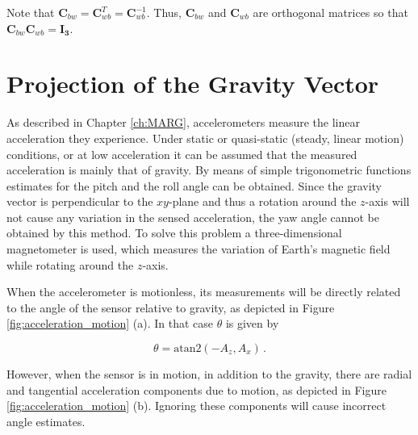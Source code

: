 \noindent
Note that $\mathbf{C}_{bw} = \mathbf{C}^T_{wb} = \mathbf{C}^{-1}_{wb}$. Thus, $\mathbf{C}^{ }_{bw}$ and $\mathbf{C}_{wb}$ are orthogonal matrices so that $\mathbf{C}^{ }_{bw} \mathbf{C}_{wb} = \mathbf{I_3}$.  

\section{Projection of the Gravity Vector}\label{sec:projection_gravity}


As described in Chapter \ref{ch:MARG}, accelerometers measure the linear acceleration they experience. Under static or quasi-static (steady, linear motion) conditions, or at low acceleration it can be assumed that the measured acceleration is mainly that of gravity. By means of simple trigonometric functions estimates for the pitch and the roll angle can be obtained. Since the gravity vector is perpendicular to the $xy$-plane and thus a rotation around the $z$-axis will not cause any variation in the sensed acceleration, the yaw angle cannot be obtained by this method. To solve this problem a three-dimensional magnetometer is used, which measures the variation of Earth's magnetic field while rotating around the $z$-axis.

When the accelerometer is motionless, its measurements will be directly related to the angle of the sensor relative to gravity, as depicted in Figure \ref{fig:acceleration_motion} (a). In that case $\theta$ is given by

\begin{equation} \label{eq:projection_gravity}
  \theta = \mbox{atan}2(-A_z, A_x)\,.
\end{equation}

\noindent
However, when the sensor is in motion, in addition to the gravity, there are radial and tangential acceleration components due to motion, as depicted in Figure \ref{fig:acceleration_motion} (b). Ignoring these components will cause incorrect angle estimates.

